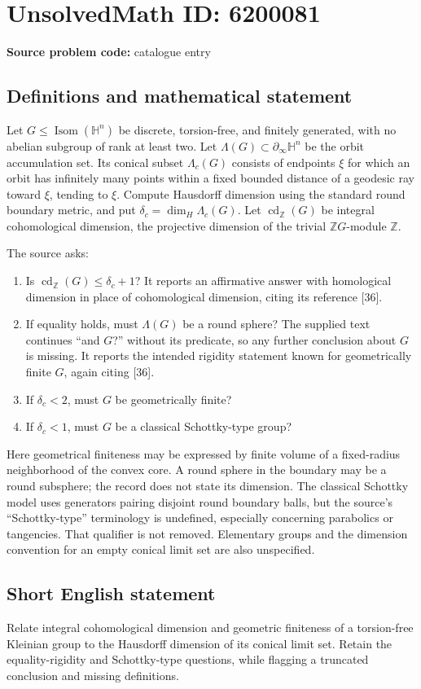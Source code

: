 \documentclass[11pt]{article}
\begin{document}
\section*{UnsolvedMath ID: 6200081}
\textbf{Source problem code:} catalogue entry
\subsection{Definitions and mathematical statement}
Let $G\leq\operatorname{Isom}(\mathbb H^n)$ be discrete, torsion-free, and finitely generated, with no abelian subgroup of rank at least two. Let $\Lambda(G)\subset\partial_\infty\mathbb H^n$ be the orbit accumulation set. Its conical subset $\Lambda_c(G)$ consists of endpoints $\xi$ for which an orbit has infinitely many points within a fixed bounded distance of a geodesic ray toward $\xi$, tending to $\xi$. Compute Hausdorff dimension using the standard round boundary metric, and put $\delta_c=\dim_H\Lambda_c(G)$. Let $\operatorname{cd}_{\mathbb Z}(G)$ be integral cohomological dimension, the projective dimension of the trivial $\mathbb ZG$-module $\mathbb Z$.

The source asks:
\begin{enumerate}
\item Is $\operatorname{cd}_{\mathbb Z}(G)\leq\delta_c+1$? It reports an affirmative answer with homological dimension in place of cohomological dimension, citing its reference [36].
\item If equality holds, must $\Lambda(G)$ be a round sphere? The supplied text continues ``and $G$?'' without its predicate, so any further conclusion about $G$ is missing. It reports the intended rigidity statement known for geometrically finite $G$, again citing [36].
\item If $\delta_c<2$, must $G$ be geometrically finite?
\item If $\delta_c<1$, must $G$ be a classical Schottky-type group?
\end{enumerate}
Here geometrical finiteness may be expressed by finite volume of a fixed-radius neighborhood of the convex core. A round sphere in the boundary may be a round subsphere; the record does not state its dimension. The classical Schottky model uses generators pairing disjoint round boundary balls, but the source's ``Schottky-type'' terminology is undefined, especially concerning parabolics or tangencies. That qualifier is not removed. Elementary groups and the dimension convention for an empty conical limit set are also unspecified.
\subsection{Short English statement}
Relate integral cohomological dimension and geometric finiteness of a torsion-free Kleinian group to the Hausdorff dimension of its conical limit set. Retain the equality-rigidity and Schottky-type questions, while flagging a truncated conclusion and missing definitions.
\end{document}
